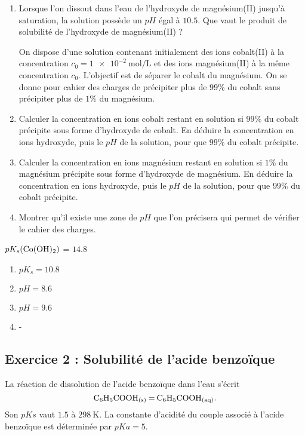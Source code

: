 \begin{enumerate}
	\item Lorsque l'on dissout dans l'eau de l'hydroxyde de magnésium(II) jusqu'à saturation, la solution possède un $pH$ égal à $10.5$. Que vaut le produit de solubilité de l'hydroxyde de magnésium(II) ? 
	
	On dispose d'une solution contenant initialement des ions cobalt(II)  à la concentration $c_0 = \SI{1e-2}{\mole\per\liter}$ et des ions magnésium(II) à la même concentration $c_0$. L'objectif est de séparer le cobalt du magnésium. On se donne pour cahier des charges de précipiter plus de $99\%$ du cobalt sans précipiter plus de $1\%$ du magnésium.
	
	\item Calculer la concentration en ions cobalt restant en solution si $99\%$ du cobalt précipite sous forme d'hydroxyde de cobalt. En déduire la concentration en ions hydroxyde, puis le $pH$ de la solution, pour que $99\%$ du cobalt précipite.
	
	\item Calculer la concentration en ions magnésium restant en solution si $1\%$ du magnésium précipite sous forme d'hydroxyde de magnésium. En déduire la concentration en ions hydroxyde, puis le $pH$ de la solution, pour que $99\%$ du cobalt précipite. 
	
	\item Montrer qu'il existe une zone de $pH$ que l'on précisera qui permet de vérifier le cahier des charges.
\end{enumerate}

 $pK_s(\ce{Co(OH)2})$ = $\SI{14.8}{}$

\begin{enumerate}
	\item $pK_{s} = \SI{10.8}{}$
	\item $pH = 8.6$
	\item $pH = 9.6$
	\item -
\end{enumerate}

\subsection{Exercice 2 : Solubilité de l'acide benzoïque}

La réaction de dissolution de l'acide benzoïque dans l'eau s'écrit $$\ce{C6H5COOH_{(s)} = C6H5COOH_{(aq)}}.$$ Son $pKs$ vaut $1.5$ à $\SI{298}{\kelvin}$. La constante d'acidité du couple associé à l'acide benzoïque est déterminée par $pKa = 5$. 

